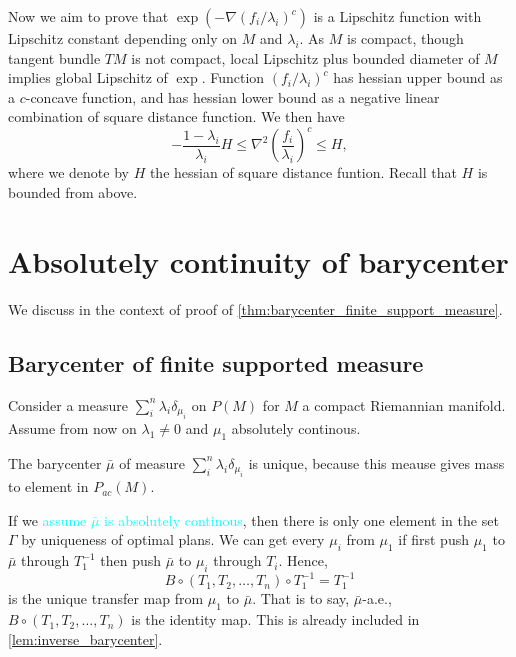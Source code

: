 Now we aim to prove that \( \exp(- \nabla (f_i /\lambda_i)^c) \) is a Lipschitz function with Lipschitz constant depending only on $M$ and $\lambda_i$.
As $M$ is compact, though tangent bundle $TM$ is not compact, local Lipschitz plus bounded diameter of $M$ implies global Lipschitz of $\exp$.
Function $(f_i /\lambda_i)^c$ has hessian upper bound as a $c$-concave function,
and has hessian lower bound as a negative linear combination of square distance function.
We then have
\begin{equation}
	\label{equa:hessian_bound_f}
	-\frac{1-\lambda_i}{\lambda_i} H \leq \nabla^2 \left(\frac{f_i}{\lambda_i}\right)^c \leq H,
\end{equation}
where we denote by $H$ the hessian of square distance funtion.
Recall that $H$ is bounded from above.

\section{Absolutely continuity of barycenter}

We discuss in the context of proof of \cref{thm:barycenter_finite_support_measure}.

\subsection{Barycenter of finite supported measure}

Consider a measure $\sum_{i}^{n} \lambda_{i} \delta_{\mu_i}$ on $P(M)$ for $M$ a compact Riemannian manifold.
Assume from now on $ \lambda_1 \neq 0$ and $\mu_1$ absolutely continous.

The barycenter $\bar{\mu}$ of measure $\sum_{i}^{n} \lambda_{i} \delta_{\mu_i}$ is unique,
because this meause gives mass to element in $P_{ac}(M)$.

If we \textcolor{cyan}{assume $\bar{\mu}$ is absolutely continous},
then there is only one element in the set $\Gamma$ by uniqueness of optimal plans.
We can get every $\mu_i$ from $\mu_1$ if first push $\mu_1$ to $\bar{\mu}$ through $T_1^{-1}$ then push $\bar{\mu}$ to $\mu_i$ through $T_i$. Hence,
\[B \circ (T_1, T_2, \ldots, T_n) \circ T_1^{-1} = T_1^{-1}\]
is the unique transfer map from $\mu_1$ to $\bar{\mu}$. That is to say, $\bar{\mu}$-a.e., $B \circ (T_1, T_2, \ldots, T_n) $ is the identity map.
This is already included in \cref{lem:inverse_barycenter}.

